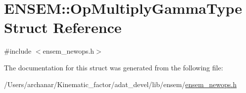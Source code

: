 \hypertarget{structENSEM_1_1OpMultiplyGammaType}{}\section{E\+N\+S\+EM\+:\+:Op\+Multiply\+Gamma\+Type Struct Reference}
\label{structENSEM_1_1OpMultiplyGammaType}


{\ttfamily \#include $<$ensem\+\_\+newops.\+h$>$}



The documentation for this struct was generated from the following file\+:\begin{DoxyCompactItemize}
\item 
/\+Users/archanar/\+Kinematic\+\_\+factor/adat\+\_\+devel/lib/ensem/\mbox{\hyperlink{lib_2ensem_2ensem__newops_8h}{ensem\+\_\+newops.\+h}}\end{DoxyCompactItemize}
